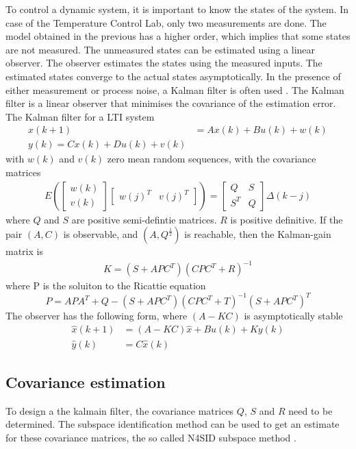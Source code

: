 To control a dynamic system, it is important to know the states of the system. In case of the Temperature Control Lab, only two measurements are done. The model obtained in the previous has a higher order, which implies that some states are not measured. The unmeasured states can be estimated using a linear observer. The observer estimates the states using the measured inputs. The estimated states converge to the actual states asymptotically.
In the presence of either measurement or process noise, a Kalman filter is often used \cite{kalmanFilter}. The Kalman filter is a linear observer that minimises the covariance of the estimation error. The Kalman filter for a LTI system \cite[p.~162]{FilteringIdentification}
\begin{align*}
    x(k+1) &= Ax(k) +Bu(k) + w(k)\\
    y(k) = Cx(k) + Du(k) + v(k)
\end{align*}
with $w(k)$ and $v(k)$ zero mean random sequences, with the covariance matrices
\begin{align*}
    E(\begin{bmatrix} w(k) \\ v(k) \end{bmatrix} \begin{bmatrix} w(j)^T & v(j)^T \end{bmatrix}) = \begin{bmatrix} Q & S \\ S^T & Q \end{bmatrix} \Delta(k-j)
\end{align*}
where $Q$ and $S$ are positive semi-defintie matrices. $R$ is positive definitive. If the pair $(A,C)$ is observable, and $(A,Q^{\frac{1}{2}})$ is reachable, then the Kalman-gain matrix is 
\begin{align*}
    K = (S+APC^T)(CPC^T+R)^{-1}
\end{align*}
where P is the soluiton to the Ricattie equation
$$
    P = APA^T + Q - (S+APC^T)(CPC^T+T)^{-1}(S+APC^T)^T
$$
The observer has the following form, where $(A-KC)$ is asymptotically stable
\begin{align*}
    \hat{x}(k+1) &= (A-KC)\hat{x} + Bu(k) + Ky(k)\\
    \hat{y}(k) &= C\hat{x}(k)
\end{align*}
\subsection{Covariance estimation}
To design a the kalmain filter, the covariance matrices $Q$, $S$ and $R$ need to be determined. The subspace identification method can be used to get an estimate for these covariance matrices, the so called N4SID subspace method \cite{VANOVERSCHEE199475}.